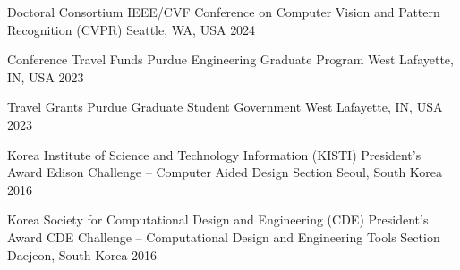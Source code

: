 

\begin{cvhonors}

\cvhonor
{Doctoral Consortium} %
{IEEE/CVF Conference on Computer Vision and Pattern Recognition (CVPR)} %
{Seattle, WA, USA} %
{2024} %

\cvhonor
{Conference Travel Funds} %
{Purdue Engineering Graduate Program} %
{West Lafayette, IN, USA} %
{2023} %

\cvhonor
{Travel Grants} %
{Purdue Graduate Student Government} %
{West Lafayette, IN, USA} %
{2023} %

\cvhonor
{Korea Institute of Science and Technology Information (KISTI)  President’s Award} %
{\hspace{10em} Edison Challenge –  Computer Aided Design Section} %
{Seoul, South Korea} %
{2016} %


\cvhonor
{Korea Society for Computational Design and Engineering (CDE) President’s Award} %
{\hspace{10em} CDE Challenge – Computational Design and Engineering Tools Section} %
{Daejeon, South Korea} %
{2016} %


\end{cvhonors}
